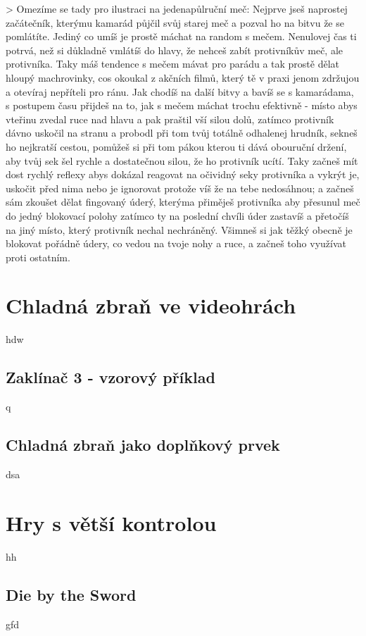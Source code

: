 > Omezíme se tady pro ilustraci na jedenapůlruční meč: Nejprve jseš naprostej začátečník, kterýmu kamarád půjčil svůj starej meč a pozval ho na bitvu že se pomlátíte. Jediný co umíš je prostě máchat na random s mečem. Nenulovej čas ti potrvá, než si důkladně vmlátíš do hlavy, že nehceš zabít protivníkův meč, ale protivníka. Taky máš tendence s mečem mávat pro parádu a tak prostě dělat hloupý machrovinky, cos okoukal z akčních filmů, který tě v praxi jenom zdržujou a otevíraj nepříteli pro ránu. 
Jak chodíš na další bitvy a bavíš se s kamarádama, s postupem času přijdeš na to, jak s mečem máchat trochu efektivně - místo abys vteřinu zvedal ruce nad hlavu a pak praštil vší silou dolů, zatímco protivník dávno uskočil na stranu a probodl při tom tvůj totálně odhalenej hrudník, sekneš ho nejkratší cestou, pomůžeš si při tom pákou kterou ti dává obouruční držení, aby tvůj sek šel rychle a dostatečnou silou, že ho protivník ucítí. Taky začneš mít dost rychlý reflexy abys dokázal reagovat na očividný seky protivníka a vykrýt je, uskočit před nima nebo je ignorovat protože víš že na tebe nedosáhnou; a začneš sám zkoušet dělat fingovaný úderý, kterýma přiměješ protivníka aby přesunul meč do jedný blokovací polohy zatímco ty na poslední chvíli úder zastavíš a přetočíš na jiný místo, který protivník nechal nechráněný. Všimneš si jak těžký obecně je blokovat pořádně údery, co vedou na tvoje nohy a ruce, a začneš toho využívat proti ostatním. 


\section{Chladná zbraň ve videohrách}
hdw

\subsection{Zaklínač 3 - vzorový příklad}
q

\subsection{Chladná zbraň jako doplňkový prvek}
dsa



\section{Hry s větší kontrolou}
hh

\subsection{Die by the Sword}
gfd

